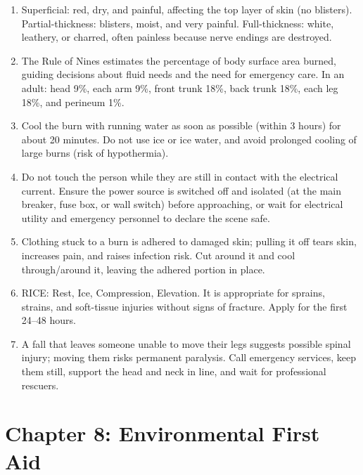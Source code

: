 \begin{enumerate}[leftmargin=*]
\item Superficial: red, dry, and painful, affecting the top layer of skin (no blisters). Partial-thickness: blisters, moist, and very painful. Full-thickness: white, leathery, or charred, often painless because nerve endings are destroyed.
\item The Rule of Nines estimates the percentage of body surface area burned, guiding decisions about fluid needs and the need for emergency care. In an adult: head 9\%, each arm 9\%, front trunk 18\%, back trunk 18\%, each leg 18\%, and perineum 1\%.
\item Cool the burn with running water as soon as possible (within 3 hours) for about 20 minutes. Do not use ice or ice water, and avoid prolonged cooling of large burns (risk of hypothermia).
\item Do not touch the person while they are still in contact with the electrical current. Ensure the power source is switched off and isolated (at the main breaker, fuse box, or wall switch) before approaching, or wait for electrical utility and emergency personnel to declare the scene safe.
\item Clothing stuck to a burn is adhered to damaged skin; pulling it off tears skin, increases pain, and raises infection risk. Cut around it and cool through/around it, leaving the adhered portion in place.
\item RICE: Rest, Ice, Compression, Elevation. It is appropriate for sprains, strains, and soft-tissue injuries without signs of fracture. Apply for the first 24--48 hours.
\item A fall that leaves someone unable to move their legs suggests possible spinal injury; moving them risks permanent paralysis. Call emergency services, keep them still, support the head and neck in line, and wait for professional rescuers.
\end{enumerate}

\section*{Chapter 8: Environmental First Aid}

